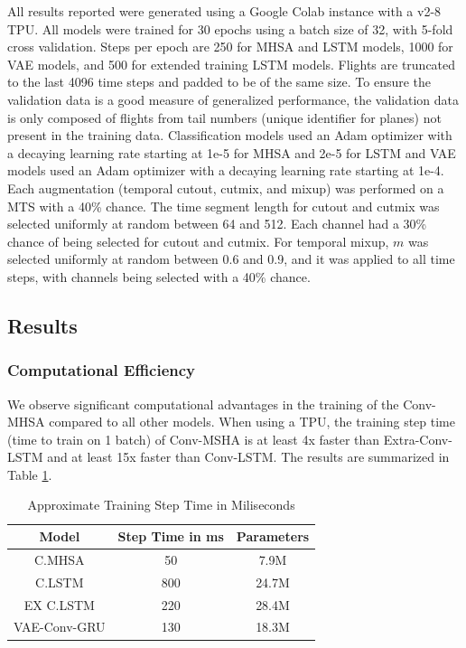 \documentclass[letterpaper]{article} %
\begin{document}
All results reported were generated using a Google Colab instance with a v2-8 TPU. All models were trained for 30 epochs using a batch size of 32, with 5-fold cross validation. Steps per epoch are 250 for MHSA and LSTM models, 1000 for VAE models, and 500 for extended training LSTM models.  Flights are truncated to the last 4096 time steps and padded to be of the same size. To ensure the validation data is a good measure of generalized performance, the validation data is only composed of flights from tail numbers (unique identifier for planes) not present in the training data. Classification models used an Adam optimizer with a decaying learning rate starting at 1e-5 for MHSA and 2e-5 for LSTM and VAE models used an Adam optimizer with a decaying learning rate starting at 1e-4. Each augmentation (temporal cutout, cutmix, and mixup) was performed on a MTS with a 40\% chance. The time segment length for cutout and cutmix was selected uniformly at random between 64 and 512. Each channel had a 30\% chance of being selected for cutout and cutmix. For temporal mixup, $m$ was selected uniformly at random between 0.6 and 0.9, and it was applied to all time steps, with channels being selected with a 40\% chance. 
\subsection{Results}
 
\subsubsection{Computational Efficiency}

We observe significant computational advantages in the training of the Conv-MHSA compared to all other models. When using a TPU, the training step time (time to train on 1 batch) of Conv-MSHA is at least 4x faster than Extra-Conv-LSTM and at least 15x faster than Conv-LSTM. The results are summarized in Table \ref{Compute Time}.


\begin{table}[t!]
\centering
\begin{tabular}{ |c|c|c| } 
 \hline
 Model & Step Time in ms & Parameters\\
 \hline 
 C.MHSA & 50 & 7.9M\\
 \hline 
 C.LSTM & 800 & 24.7M\\
 \hline 
 EX C.LSTM & 220 & 28.4M\\
 \hline 
 VAE-Conv-GRU &  130 & 18.3M\\
 \hline
\end{tabular}
\caption{Approximate Training Step Time in Miliseconds}
\label{Compute Time}
\end{table}
\end{document}
